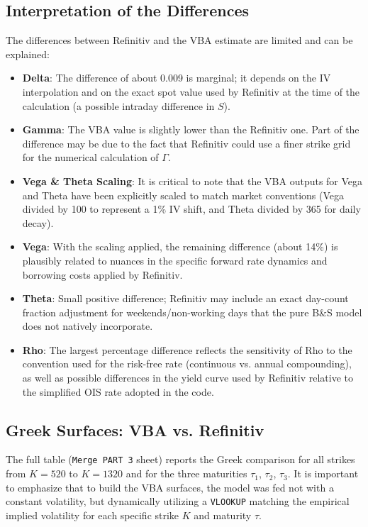 \documentclass{report}
\begin{document}
\subsection{Interpretation of the Differences}
 
The differences between Refinitiv and the VBA estimate are limited and can be
explained:
 
\begin{itemize}
  \item \textbf{Delta}: The difference of about 0.009 is marginal; it depends on the
        IV interpolation and on the exact spot value used by Refinitiv at the time of
        the calculation (a possible intraday difference in $S$).
  \item \textbf{Gamma}: The VBA value is slightly lower than the Refinitiv one. Part of
        the difference may be due to the fact that Refinitiv could use a finer strike
        grid for the numerical calculation of $\Gamma$.
  \item \textbf{Vega \& Theta Scaling}: It is critical to note that the VBA outputs for Vega and Theta have been explicitly scaled to match market conventions (Vega divided by 100 to represent a 1\% IV shift, and Theta divided by 365 for daily decay). 
  \item \textbf{Vega}: With the scaling applied, the remaining difference (about 14\%) is plausibly related to nuances in the specific forward rate dynamics and borrowing costs applied by Refinitiv.
  \item \textbf{Theta}: Small positive difference; Refinitiv may include an exact day-count fraction adjustment for weekends/non-working days that the pure B\&S model does not natively incorporate.
  \item \textbf{Rho}: The largest percentage difference reflects the sensitivity of Rho
        to the convention used for the risk-free rate (continuous vs. annual compounding),
        as well as possible differences in the yield curve used by Refinitiv relative to
        the simplified OIS rate adopted in the code.
\end{itemize}
 
\subsection{Greek Surfaces: VBA vs. Refinitiv}
 
The full table (\texttt{Merge PART 3} sheet) reports the Greek comparison for all
strikes from $K = 520$ to $K = 1320$ and for the three maturities $\tau_1$, $\tau_2$,
$\tau_3$. It is important to emphasize that to build the VBA surfaces, the model was fed not with a constant volatility, but dynamically utilizing a \texttt{VLOOKUP} matching the empirical implied volatility for each specific strike $K$ and maturity $\tau$.
 
\end{document}
